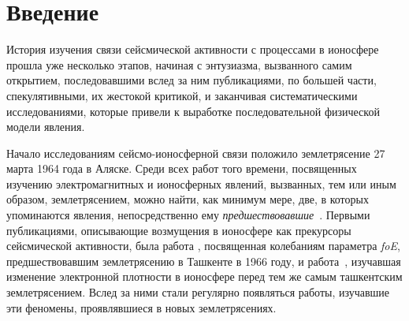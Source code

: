 \documentclass[12pt, oneside, a4paper]{article}
\begin{document}
\section{Введение}
История изучения связи сейсмической активности с процессами в ионосфере прошла уже несколько этапов, начиная с энтузиазма, вызванного самим открытием, последовавшими вслед за ним публикациями, по большей части, спекулятивными, их жестокой критикой, и заканчивая систематическими исследованиями, которые привели к выработке  последовательной физической модели явления. 

Начало исследованиям сейсмо-ионосферной связи положило землетрясение 27 марта 1964 года в Аляске. Среди всех работ того времени, посвященных изучению электромагнитных и ионосферных явлений, вызванных, тем или иным образом, землетрясением, можно найти, как минимум мере, две, в которых упоминаются явления, непосредственно ему \emph{предшествовавшие}~\cite{Moore:1964,Davies_Baker:1965}. Первыми публикациями, описывающие возмущения в ионосфере как прекурсоры сейсмической активности, была работа \cite{Antselevich:1971}, посвященная колебаниям параметра \emph{foE}, предшествовавшим землетрясению в Ташкенте в 1966 году, и работа~\cite{Datchenko:1972}, изучавшая изменение электронной плотности в ионосфере перед тем же самым ташкентским землетрясением. Вслед за ними стали регулярно появляться работы, изучавшие эти феномены, проявлявшиеся в новых землетрясениях. 
\end{document}
